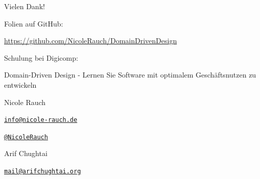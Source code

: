 {
\begin{frame}{Vielen Dank!}

        Folien auf GitHub:
        \vspace{-0.8em}
        \begin{center}
                \url{https://github.com/NicoleRauch/DomainDrivenDesign}
        \end{center}
        
       	Schulung bei Digicomp:
       	\vspace{-0.8em}
       	\begin{center}
        		Domain-Driven Design
        		- Lernen Sie Software mit optimalem Geschäftsnutzen zu entwickeln	        
        \end{center}
        
        \begin{block}{Nicole Rauch}
        \begin{description}[Twitterxx]
                \item[E-Mail]  \href{mailto:info@nicole-rauch.de}{\texttt{info@nicole-rauch.de}}
                \item[Twitter] \href{http://twitter.com/NicoleRauch}{\texttt{@NicoleRauch}}
        \end{description}
        \end{block}
        
        \begin{block}{Arif Chughtai}
        	\begin{description}[Twitterxx]
        		\item[E-Mail] \href{mailto:mail@arifchughtai.org}{\texttt{mail@arifchughtai.org}}
        	\end{description}
        \end{block}
        
\end{frame}
}
